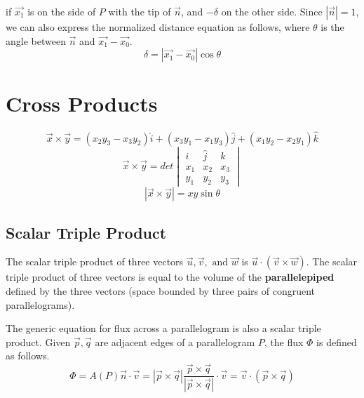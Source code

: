 \documentclass[11pt]{article}
\begin{document}
		if $\vec{x_1}$ is on the side of $P$ with the tip of $\vec{n}$, and $-\delta$ on the other side. Since $|\vec{n}| = 1$, we can also express the normalized distance equation as follows, where $\theta$ is the angle between $\vec{n}$ and $\vec{x_1}-\vec{x_0}$.
		\begin{equation}
			\delta = |\vec{x_1}-\vec{x_0}|\cos\theta
		\end{equation}
		
\section{Cross Products}
	\begin{equation}
		\vec{x}\times\vec{y} = (x_2y_3-x_3y_2)\hat{i}+(x_3y_1-x_1y_3)\hat{j}+(x_1y_2-x_2y_1)\hat{k}
	\end{equation}
	\begin{equation}
		\vec{x}\times\vec{y} = det
		\begin{vmatrix}
			\hat{i} & \hat{j} & \hat{k}\\
			x_1 & x_2 & x_3\\
			y_1 & y_2 & y_3
		\end{vmatrix}
	\end{equation}
	\begin{equation}
		|\vec{x}\times\vec{y}| = xy\sin\theta
	\end{equation}
	
	\subsection{Scalar Triple Product}
		The scalar triple product of three vectors $\vec{u}, \vec{v}, \text{ and }\vec{w}$ is $\vec{u}\cdot(\vec{v}\times\vec{w})$. The scalar triple product of three vectors is equal to the volume of the \textbf{parallelepiped} defined by the three vectors (space bounded by three pairs of congruent parallelograms). 
		
		The generic equation for flux across a parallelogram is also a scalar triple product. Given $\vec{p},\vec{q}$ are adjacent edges of a parallelogram $P$, the flux $\Phi$ is defined as follows.
		\begin{equation}
			\Phi = A(P)\vec{n}\cdot\vec{v} = |\vec{p}\times\vec{q}|\frac{\vec{p}\times\vec{q}}{|\vec{p}\times\vec{q}|}\cdot\vec{v} = \vec{v}\cdot(\vec{p}\times\vec{q})
		\end{equation}
		
\end{document}

